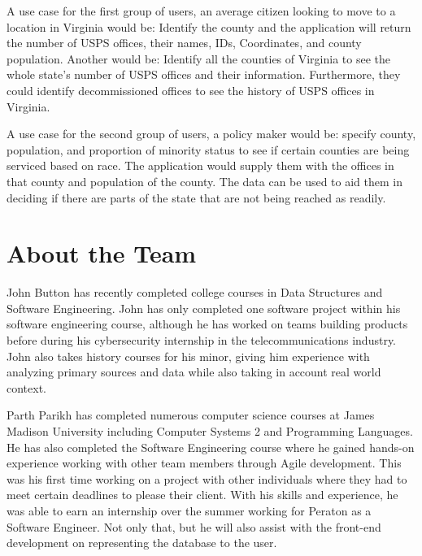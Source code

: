 \documentclass[11pt]{article}
\begin{document}
A use case for the first group of users, an average citizen looking to move to a location in Virginia would be: Identify the county and the application will return the number of USPS offices, their names, IDs, Coordinates, and county population. Another would be: Identify all the counties of Virginia to see the whole state's number of USPS offices and their information. Furthermore, they could identify decommissioned offices to see the history of USPS offices in Virginia. 

A use case for the second group of users, a policy maker would be: specify county, population, and proportion of minority status to see if certain counties are being serviced based on race. The application would supply them with the offices in that county and population of the county. The data can be used to aid them in deciding if there are parts of the state that are not being reached as readily. 

\section*{About the Team}


John Button has recently completed college courses in Data Structures and Software Engineering. John has only completed one software project within his software engineering course, although he has worked on teams building products before during his cybersecurity internship in the telecommunications industry. John also takes history courses for his minor, giving him experience with analyzing primary sources and data while also taking in account real world context.

Parth Parikh has completed numerous computer science courses at James Madison University including Computer Systems 2 and Programming Languages. He has also completed the Software Engineering course where he gained hands-on experience working with other team members through Agile development. This was his first time working on a project with other individuals where they had to meet certain deadlines to please their client. With his skills and experience, he was able to earn an internship over the summer working for Peraton as a Software Engineer. Not only that, but he will also assist with the front-end development on representing the database to the user.   
\end{document}
